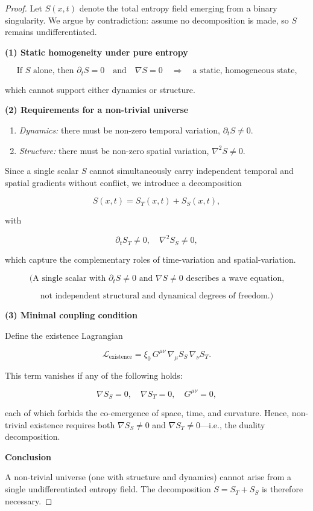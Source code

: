 \documentclass[12pt, a4paper]{article}
\begin{document}
\begin{proof}
Let $S(x,t)$ denote the total entropy field emerging from a binary singularity. We argue by contradiction: assume no decomposition is made, so $S$ remains undifferentiated.

\medskip
\noindent\textbf{(1) Static homogeneity under pure entropy}

\[
\text{If } S \text{ alone, then } \partial_t S = 0 \quad \text{and} \quad \nabla S = 0 \quad \Longrightarrow \quad \text{a static, homogeneous state,}
\]

which cannot support either dynamics or structure.

\medskip
\noindent\textbf{(2) Requirements for a non-trivial universe}

\begin{enumerate}
    \item \emph{Dynamics:} there must be non-zero temporal variation, $\partial_t S \neq 0$.
    \item \emph{Structure:} there must be non-zero spatial variation, $\nabla^2 S \neq 0$.
\end{enumerate}

Since a single scalar $S$ cannot simultaneously carry independent temporal and spatial gradients without conflict, we introduce a decomposition

\[
S(x,t) = S_T(x,t) + S_S(x,t),
\]

with

\[
\partial_t S_T \neq 0, \quad \nabla^2 S_S \neq 0,
\]

which capture the complementary roles of time-variation and spatial-variation.

\medskip
\noindent
\[
\text{(A single scalar with } \partial_t S \neq 0 \text{ and } \nabla S \neq 0
\text{ describes a wave equation,}
\]

\[
\text{not independent structural and dynamical degrees of freedom.)}
\]

\medskip
\noindent\textbf{(3) Minimal coupling condition}

Define the existence Lagrangian

\[
\mathcal{L}_{\mathrm{existence}} = \xi_0 \, G^{\mu\nu} \, \nabla_\mu S_S \, \nabla_\nu S_T.
\]

This term vanishes if any of the following holds:

\[
\nabla S_S = 0, \quad \nabla S_T = 0, \quad G^{\mu\nu} = 0,
\]

each of which forbids the co-emergence of space, time, and curvature. Hence, non-trivial existence requires both $\nabla S_S \neq 0$ and $\nabla S_T \neq 0$—i.e., the duality decomposition.

\medskip
\noindent\textbf{Conclusion}

A non-trivial universe (one with structure and dynamics) cannot arise from a single undifferentiated entropy field. The decomposition $S = S_T + S_S$ is therefore necessary.
\end{proof}
\end{document}
